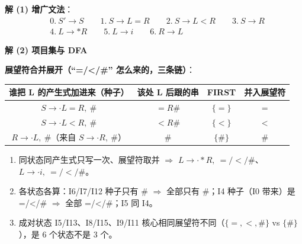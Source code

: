 \documentclass[12pt,a4paper,fontset=windows]{ctexart}
\newcommand{\imp}{\ensuremath{\Rightarrow}}
\begin{document}
\textbf{解 (1) 增广文法}：
\[
\begin{aligned}
& 0.\ S' \to S \qquad 1.\ S \to L = R \qquad 2.\ S \to L < R \qquad 3.\ S \to R\\
& 4.\ L \to * R \qquad 5.\ L \to i \qquad 6.\ R \to L
\end{aligned}
\]

\textbf{解 (2) 项目集与 DFA}

\textbf{展望符合并展开（``=/</\#'' 怎么来的，三条链）}：

\begin{center}
\renewcommand{\arraystretch}{1.25}
\begin{tabular}{c c c c}
\toprule
\textbf{谁把 L 的产生式加进来（种子）} & \textbf{该处 L 后跟的串} & \textbf{FIRST} & \textbf{并入展望符} \\
\midrule
$S \to \cdot L=R,\ \#$ & $=R\#$ & $\{=\}$ & $=$ \\
$S \to \cdot L<R,\ \#$ & $<R\#$ & $\{<\}$ & $<$ \\
$R \to \cdot L,\ \#$（来自 $S \to \cdot R,\ \#$） & $\#$ & $\{\#\}$ & $\#$ \\
\bottomrule
\end{tabular}
\end{center}

\begin{enumerate}
\item 同状态同产生式只写一次、展望符取并 \imp{} $L \to \cdot *R,\ =/</\#$、$L \to \cdot i,\ =/</\#$。
\item 各状态各算：I6/I7/I12 种子只有 \# \imp{} 全部只有 \#；I4 种子（I0 带来）是 =/</\# \imp{} 全部 =/</\#；I5 同 I4。
\item 成对状态 I5/I13、I8/I15、I9/I11 核心相同展望符不同（$\{=,<,\#\}$ vs $\{\#\}$），是 6 个状态不是 3 个。
\end{enumerate}
\end{document}
